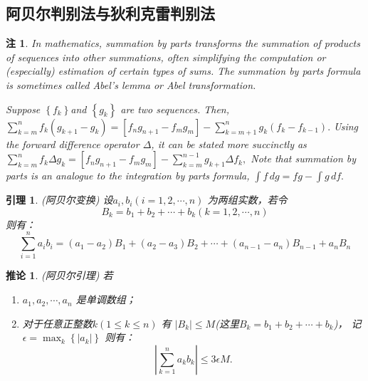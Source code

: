 \documentclass[a4paper,12pt]{article}
\newtheorem{lemma}{引理}
\newtheorem{corollary}{推论}
\newtheorem{remark}{注}
\begin{document}
\subsection{阿贝尔判别法与狄利克雷判别法}
\begin{remark}
In mathematics, summation by parts transforms the summation 
of products of sequences into other summations, often simplifying the 
computation or (especially) estimation of certain types of sums. 
The summation by parts formula is sometimes called Abel's 
lemma or Abel transformation.

Suppose $\left\{f_k\right\} $and $\displaystyle \left\{g_k\right\}$ are two sequences.
Then,$\displaystyle \sum_{k=m}^n f_k(g_{k+1}-g_k) = \left[f_{n}g_{n+1} - f_m g_m\right] 
- \sum_{k=m+1}^n g_{k}(f_{k}- f_{k-1}).$
Using the forward difference operator $\displaystyle \Delta$, it can be stated 
more succinctly as $\displaystyle \sum_{k=m}^n f_k\Delta g_k = \left[f_{n} g_{n+1} 
- f_m g_m\right] - \sum_{k=m}^{n-1} g_{k+1}\Delta f_k,$
Note that summation by parts is an analogue to the integration by parts formula,
$\displaystyle \int f\,dg = f g - \int g\,df.$
\end{remark}

\begin{lemma}{\rm (阿贝尔变换)}
    设$a_i, b_i (i=1,2,\cdots,n)$ 为两组实数，若令
    \[
        B_k = b_1 + b_2 + \cdots + b_k (k = 1,2,\cdots,n)
        \]
    则有：
    \begin{equation}
        \sum_{i=1}^n a_ib_i = (a_1-a_2)B_1 + (a_2-a_3)B_2 + \cdots + (a_{n-1}-a_n)B_{n-1}+a_nB_n
        \label{eq:eq5}
    \end{equation}
\end{lemma}

\begin{corollary}{\rm(阿贝尔引理)}
    若
    \begin{enumerate}[label={\rm(\arabic*)}]
        \item $\displaystyle a_1, a_2, \cdots, a_n$ 是单调数组；
        \item  对于任意正整数$\displaystyle k(1 \le k \le n)$ 有
            $\displaystyle \left|B_k\right| \le M $\rm(这里$\displaystyle B_k = b_1 + b_2 + \cdots + b_k$)，
            记$\epsilon  = \max_k\left\{\left|a_k\right|\right\}$
        则有：
            \begin{equation}
                \left|\sum_{k=1}^na_kb_k\right| \le 3 \epsilon M.
                \label{eq:eq6}
            \end{equation}
    \end{enumerate}
\end{corollary}
\end{document}
